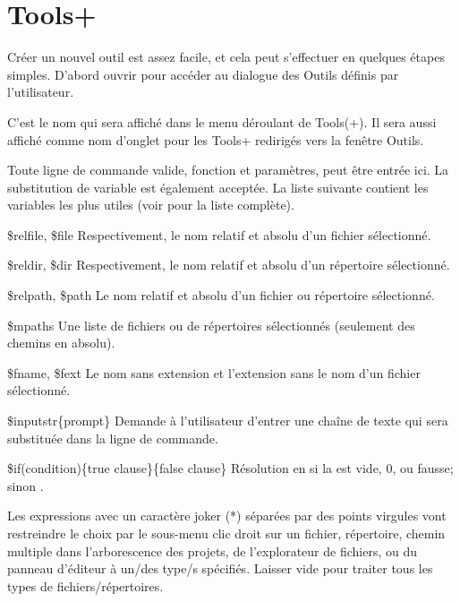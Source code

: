 \section{Tools+}\label{sec:tools+}

Créer un nouvel outil est assez facile, et cela peut s'effectuer en quelques étapes simples. D'abord ouvrir  pour accéder au dialogue des Outils définis par l'utilisateur.



C'est le nom qui sera affiché dans le menu déroulant de Tools(+). Il sera aussi affiché comme nom d'onglet pour les Tools+ redirigés vers la fenêtre Outils.


Toute ligne de commande valide, fonction et paramètres, peut être entrée ici. La substitution de variable est également acceptée. La liste suivante contient les variables les plus utiles (voir  pour la liste complète).

\begin{codeentry}
\item[\$relfile, \$file] Respectivement, le nom relatif et absolu d'un fichier sélectionné.
\item[\$reldir, \$dir] Respectivement, le nom relatif et absolu d'un répertoire sélectionné.
\item[\$relpath, \$path] Le nom relatif et absolu d'un fichier ou répertoire sélectionné.
\item[\$mpaths] Une liste de fichiers ou de répertoires sélectionnés (seulement des chemins en absolu).
\item[\$fname, \$fext] Le nom sans extension et l'extension sans le nom d'un fichier sélectionné.
\item[\$inputstr\{prompt\}] Demande à l'utilisateur d'entrer une chaîne de texte qui sera substituée dans la ligne de commande.
\item[\$if(condition)\{true clause\}\{false clause\}] Résolution en  si la  est vide, 0, ou fausse; sinon .
\end{codeentry}


Les expressions avec un caractère joker (*) séparées par des points virgules vont restreindre le choix par le sous-menu clic droit sur un fichier, répertoire, chemin multiple dans l'arborescence des projets, de l'explorateur de fichiers, ou du panneau d'éditeur à un/des type/s spécifiés. Laisser vide pour traiter tous les types de fichiers/répertoires.

